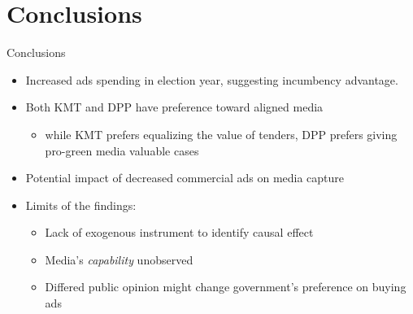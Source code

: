 \documentclass[
  10pt,
  ignorenonframetext,
  aspectratio=169,
]{beamer}
\providecommand{\tightlist}{%
  \setlength{\itemsep}{0pt}\setlength{\parskip}{0pt}}
\begin{document}
\begin{frame}

\end{frame}

\hypertarget{conclusions}{%
\section{Conclusions}\label{conclusions}}

\begin{frame}{Conclusions}
\begin{itemize}
\tightlist
\item
  Increased ads spending in election year, suggesting incumbency
  advantage.
\item
  Both KMT and DPP have preference toward aligned media

  \begin{itemize}
  \tightlist
  \item
    while KMT prefers equalizing the value of tenders, DPP prefers
    giving pro-green media valuable cases
  \end{itemize}
\item
  Potential impact of decreased commercial ads on media capture
\item
  Limits of the findings:

  \begin{itemize}
  \tightlist
  \item
    Lack of exogenous instrument to identify causal effect
  \item
    Media's \emph{capability} unobserved
  \item
    Differed public opinion might change government's preference on
    buying ads
  \end{itemize}
\end{itemize}
\end{frame}
\end{document}
